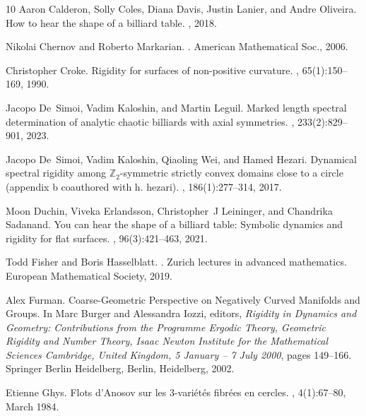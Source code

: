 \documentclass[reqno,11pt]{amsart}
\begin{document}
\begin{thebibliography}{10}
Aaron Calderon, Solly Coles, Diana Davis, Justin Lanier, and Andre Oliveira.
\newblock How to hear the shape of a billiard table.
, 2018.

Nikolai Chernov and Roberto Markarian.
.
\newblock American Mathematical Soc., 2006.

Christopher Croke.
\newblock Rigidity for surfaces of non-positive curvature.
, 65(1):150--169, 1990.

Jacopo De~Simoi, Vadim Kaloshin, and Martin Leguil.
\newblock Marked length spectral determination of analytic chaotic billiards with axial symmetries.
, 233(2):829--901, 2023.

Jacopo De~Simoi, Vadim Kaloshin, Qiaoling Wei, and Hamed Hezari.
\newblock Dynamical spectral rigidity among $\mathbb{Z}_2$-symmetric strictly convex domains close to a circle (appendix b coauthored with h. hezari).
, 186(1):277--314, 2017.

Moon Duchin, Viveka Erlandsson, Christopher~J Leininger, and Chandrika Sadanand.
\newblock You can hear the shape of a billiard table: Symbolic dynamics and rigidity for flat surfaces.
, 96(3):421--463, 2021.

Todd Fisher and Boris Hasselblatt.
.
\newblock Zurich lectures in advanced mathematics. European Mathematical Society, 2019.

Alex Furman.
\newblock Coarse-{Geometric} {Perspective} on {Negatively} {Curved} {Manifolds} and {Groups}.
\newblock In Marc Burger and Alessandra Iozzi, editors, {\em Rigidity in {Dynamics} and {Geometry}: {Contributions} from the {Programme} {Ergodic} {Theory}, {Geometric} {Rigidity} and {Number} {Theory}, {Isaac} {Newton} {Institute} for the {Mathematical} {Sciences} {Cambridge}, {United} {Kingdom}, 5 {January} – 7 {July} 2000}, pages 149--166. Springer Berlin Heidelberg, Berlin, Heidelberg, 2002.

Etienne Ghys.
\newblock Flots d'{Anosov} sur les 3-variétés fibrées en cercles.
, 4(1):67--80, March 1984.


\end{thebibliography}
\end{document}
